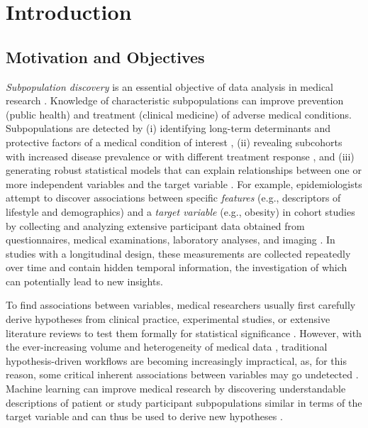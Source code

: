 \documentclass[
  oneside]{book}
\begin{document}
\hypertarget{intro}{%
\chapter{Introduction}\label{intro}}

\hypertarget{motivation-and-objectives}{%
\section{Motivation and Objectives}\label{motivation-and-objectives}}

\emph{Subpopulation discovery} is an essential objective of data analysis in medical research \autocite{schork2015personalized,shivade2014review}.
Knowledge of characteristic subpopulations can improve prevention (public health) and treatment (clinical medicine) of adverse medical conditions.
Subpopulations are detected by
(i) identifying long-term determinants and protective factors of a medical condition of interest \autocite{guo2020diabetes,boehme2017stroke,oliver2020causes},
(ii) revealing subcohorts with increased disease prevalence or with different treatment response \autocite{sanchez2020interpreting,cimini2021adipose,cohen2020clinical}, and
(iii) generating robust statistical models that can explain relationships between one or more independent variables and the target variable \autocite{tsiatis2019dynamic,hong2019quantile,guglielmi2019statistical}.
For example, epidemiologists attempt to discover associations between specific \emph{features} (e.g., descriptors of lifestyle and demographics) and a \emph{target variable} (e.g., obesity) in cohort studies by collecting and analyzing extensive participant data obtained from questionnaires, medical examinations, laboratory analyses, and imaging \autocite{Voelzke:SHIP11,who1988world,holle2005kora,hofman2009rotterdam}.
In studies with a longitudinal design, these measurements are collected repeatedly over time and contain hidden temporal information, the investigation of which can potentially lead to new insights.

To find associations between variables, medical researchers usually first carefully derive hypotheses from clinical practice, experimental studies, or extensive literature reviews to test them formally for statistical significance \autocite{Klemm14}.
However, with the ever-increasing volume and heterogeneity of medical data \autocite{shilo2020axes}, traditional hypothesis-driven workflows are becoming increasingly impractical, as, for this reason, some critical inherent associations between variables may go undetected \autocite{viceconti2015big}.
Machine learning can improve medical research by discovering understandable descriptions of patient or study participant subpopulations similar in terms of the target variable and can thus be used to derive new hypotheses \autocite{friederich2021scientific,stead2018clinical}.
\end{document}
